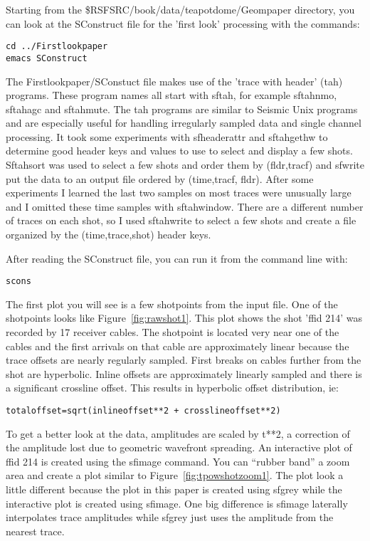 Starting from the \$RSFSRC/book/data/teapotdome/Geompaper directory, you can look at the SConstruct file for the 'first look' processing with the commands:
\begin{verbatim}
cd ../Firstlookpaper
emacs SConstruct
\end{verbatim}

The Firstlookpaper/SConstuct file makes use of the 'trace with header' (tah) programs.  These program names all start with sftah, for example sftahnmo, sftahagc and sftahmute.  The tah programs are similar to Seismic Unix programs and are especially useful for handling irregularly sampled data and single channel processing.   It took some experiments with sfheaderattr and sftahgethw to determine good header keys and values to use to select and display a few shots.  Sftahsort was used to select a few shots and order them by (fldr,tracf) and sfwrite put the data to an output file ordered by (time,tracf, fldr).  After some experiments I learned the last two samples on most traces were unusually large and I omitted these time samples with sftahwindow.   There are a different number of traces on each shot, so I used sftahwrite to select a few shots and create a file organized by the (time,trace,shot) header keys. 

After reading the SConstruct file, you can run it from the command line with:
\begin{verbatim}   
scons
\end{verbatim}   

The first plot you will see is a few shotpoints from the input file.  One of the shotpoints looks like Figure~\ref{fig:rawshot1}.  This plot shows the shot 'ffid 214' was recorded by 17 receiver cables.  The shotpoint is located very near one of the cables and the first arrivals on that cable are approximately linear because the trace offsets are nearly regularly sampled.  First breaks on cables further from the shot are hyperbolic.   Inline offsets are approximately linearly sampled and there is a significant crossline offset.  This results in hyperbolic offset distribution, ie:
\begin{verbatim}   
totaloffset=sqrt(inlineoffset**2 + crosslineoffset**2) 
\end{verbatim}   

To get a better look at the data, amplitudes are scaled by t**2, a correction of the amplitude lost due to geometric wavefront spreading.  An interactive plot of ffid 214 is created using the sfimage command.  You can “rubber band” a zoom area and create a plot similar to Figure~\ref{fig:tpowshotzoom1}.   The plot look a little different because the plot in this paper is created using sfgrey while the interactive plot is created using sfimage.  One big difference is sfimage laterally interpolates trace amplitudes while sfgrey just uses the amplitude from the nearest trace.

